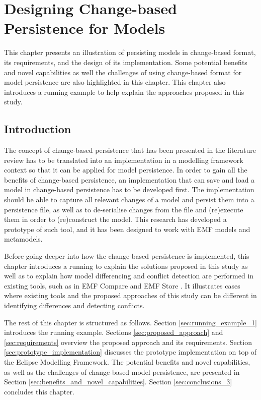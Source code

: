 \chapter{Designing Change-based Persistence for Models}
\label{ch:change_based_model_persistence}

This chapter presents an illustration of persisting models in change-based format, its requirements, and the design of its implementation. Some potential benefits and novel capabilities as well the challenges of using change-based format for model persistence are also highlighted in this chapter. This chapter also introduces a running example to help explain the approaches proposed in this study.

\section{Introduction}
\label{Introduction}

The concept of change-based persistence that has been presented in the literature review has to be translated into an implementation in a modelling framework context so that it can be applied for model persistence. In order to gain all the benefits of change-based persistence, an implementation that can save and load a model in change-based persistence has to be developed first. The implementation should be able to capture all relevant changes of a model and persist them into a persistence file, as well as to de-serialise changes from the file and (re)execute them in order to (re)construct the model. This research has developed a prototype of such tool, and it has been designed to work with EMF models and metamodels.  

Before going deeper into how the change-based persistence is implemented, this chapter introduces a running to explain the solutions proposed in this study as well as to explain how model differencing and conflict detection are performed in existing tools, such as in EMF Compare \cite{emfcompare2018developer} and EMF Store \cite{emfstore2019what}. It illustrates cases where existing tools and the proposed approaches of this study can be different in identifying differences and detecting conflicts.

The rest of this chapter is structured as follows. Section \ref{sec:running_example_1} introduces the running example.
Sections \ref{sec:proposed_approach} and \ref{sec:requirements} overview the proposed approach and its requirements.
Section \ref{sec:prototype_implementation} discusses the prototype 
implementation on top of the Eclipse Modelling Framework. 
The potential benefits and novel capabilities, as well as the challenges 
of change-based model persistence, are presented in 
Section \ref{sec:benefits_and_novel_capabilities}. Section \ref{sec:conclusions_3} concludes this chapter.

